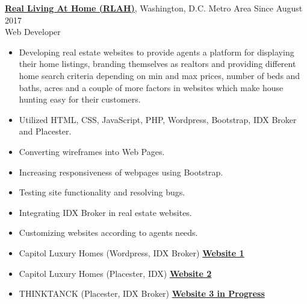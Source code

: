 \documentclass[margin,line]{res}
\begin{document}
\begin{resume}
\href{http://www.rlathome.com/}{\bf Real Living At Home (RLAH)}, Washington, D.C. Metro Area \hfill{Since August 2017}\\
Web Developer
\begin{itemize} \itemsep -2pt  %
 \item Developing real estate websites to provide agents a platform for displaying their home listings, branding themselves as realtors and providing different home search criteria depending on min and max prices, number of beds and baths, acres and a couple of more factors in websites which make house hunting easy for their customers. 
 \item Utilized HTML, CSS, JavaScript, PHP, Wordpress, Bootstrap, IDX Broker and Placester.
 \item Converting wireframes into Web Pages.
 \item Increasing responsiveness of webpages using Bootstrap.
 \item Testing site functionality and resolving bugs.
 \item Integrating IDX Broker in real estate websites.
 \item Customizing websites according to agents needs.
 \item Capitol Luxury Homes (Wordpress, IDX Broker) \href{http://dev.capitolluxuryhomes.com/}{\bf Website 1}
 \item Capitol Luxury Homes (Placester, IDX) \href{http://bit.ly/2gMSN8T}{\bf Website 2}
 \item THINKTANCK (Placester, IDX Broker) \href{http://justinlevitch2.myrealestateplatform.com}{\bf Website 3 in Progress}


 \end{itemize}


\end{resume}
\end{document}
